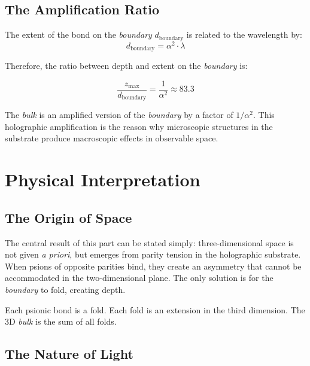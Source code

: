 \documentclass[12pt,a4paper,twoside]{article}
\newcommand{\alphaii}{\alpha^{2}}
\newcommand{\boundary}{\textit{boundary}}
\newcommand{\bulk}{\textit{bulk}}
\begin{document}
\subsection{The Amplification Ratio}

The extent of the bond on the \boundary{} $d_{\text{boundary}}$ is related to the wavelength by:
\begin{equation}
d_{\text{boundary}} = \alphaii\cdot\lambda
\label{eq:d_boundary}
\end{equation}

Therefore, the ratio between depth and extent on the \boundary{} is:
\begin{equationbox}[title={Holographic Amplification}]
\begin{equation}
\frac{z_{\max}}{d_{\text{boundary}}} = \frac{1}{\alphaii} \approx 83.3
\label{eq:amplificacao}
\end{equation}
\end{equationbox}

\noindent The \bulk{} is an amplified version of the \boundary{} by a factor of $1/\alphaii$. This holographic amplification is the reason why microscopic structures in the substrate produce macroscopic effects in observable space.


\section{Physical Interpretation}


\subsection{The Origin of Space}

The central result of this part can be stated simply: three-dimensional space is not given \textit{a priori}, but emerges from parity tension in the holographic substrate. When psions of opposite parities bind, they create an asymmetry that cannot be accommodated in the two-dimensional plane. The only solution is for the \boundary{} to fold, creating depth.

Each psionic bond is a fold. Each fold is an extension in the third dimension. The 3D \bulk{} is the sum of all folds.

\subsection{The Nature of Light}
\end{document}
